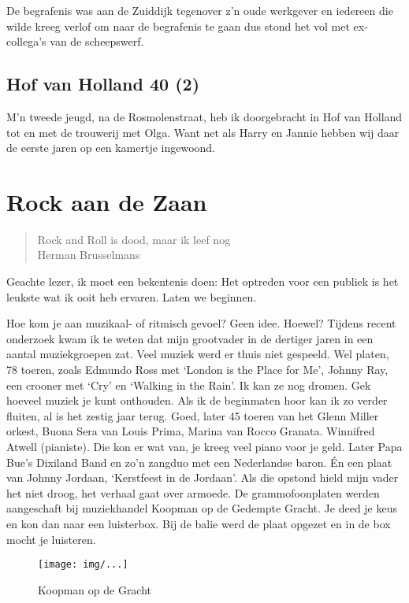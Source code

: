 \documentclass[10pt,twoside,openright]{memoir}
\begin{document}
De begrafenis was aan de Zuiddijk tegenover z’n oude werkgever en iedereen die wilde kreeg verlof om naar de begrafenis te gaan dus stond het vol met ex-collega’s van de scheepswerf. 

\chapter{Hof van Holland 40 (2)} %
\label{cha:hofvanholland2}

M’n tweede jeugd, na de Rosmolenstraat, heb ik doorgebracht in Hof van Holland tot en met de trouwerij met Olga. Want net als Harry en Jannie hebben wij daar de eerste jaren op een kamertje ingewoond.

\part{Rock aan de Zaan}

\begin{quote}
Rock and Roll is dood, maar ik leef nog \\
Herman Brusselmans
\end{quote}

Geachte lezer, ik moet een bekentenis doen: Het optreden voor een publiek is het leukste wat ik ooit heb ervaren. Laten we beginnen.

Hoe kom je aan muzikaal- of ritmisch gevoel? Geen idee. Hoewel? Tijdens recent onderzoek kwam ik te weten dat mijn grootvader in de dertiger jaren in een aantal muziekgroepen zat. Veel muziek werd er thuis niet gespeeld. Wel platen, 78 toeren, zoals Edmundo Ross met `London is the Place for Me', Johnny Ray, een crooner met `Cry' en `Walking in the Rain'. Ik kan ze nog dromen. Gek hoeveel muziek je kunt onthouden. Als ik de beginmaten hoor kan ik zo verder fluiten, al is het zestig jaar terug. Goed, later 45 toeren van het Glenn Miller orkest, Buona Sera van Louis Prima, Marina van Rocco Granata. Winnifred Atwell (pianiste). Die kon er wat van, je kreeg veel piano voor je geld. Later Papa Bue’s Dixiland Band en zo’n zangduo met een Nederlandse baron. Én een plaat van Johnny Jordaan, ‘Kerstfeest in de Jordaan’. Als die opstond hield mijn vader het niet droog, het verhaal gaat over armoede. De grammofoonplaten werden aangeschaft bij muziekhandel Koopman op de Gedempte Gracht. Je deed je keus en kon dan naar een luisterbox. Bij de balie werd de plaat opgezet en in de box mocht je luisteren. 

\begin{figure}[t]
\texttt{[image: img/...]}
\caption{Koopman op de Gracht}
\end{figure}
\end{document}
